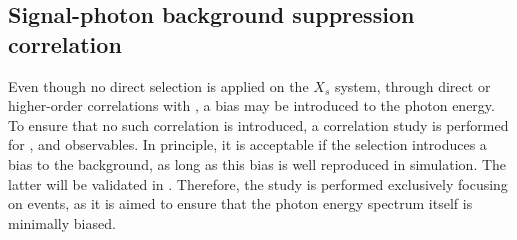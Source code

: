 \subsection{Signal-photon background suppression correlation}\label{sec:signal_photon_correlation}

Even though no direct selection is applied on the $X_s$ system, through direct or higher-order correlations with \EB, a bias may be introduced to the photon energy.
To ensure that no such correlation is introduced, a correlation study is performed for \piVeto, \etaVeto and \ZMVA observables.
In principle, it is acceptable if the selection introduces a bias to the background, as long as this bias is well reproduced in simulation.
The latter will be validated in .
Therefore, the study is performed exclusively focusing on \BtoXsgamma events, as it is aimed to ensure that the photon energy spectrum itself is minimally biased.

